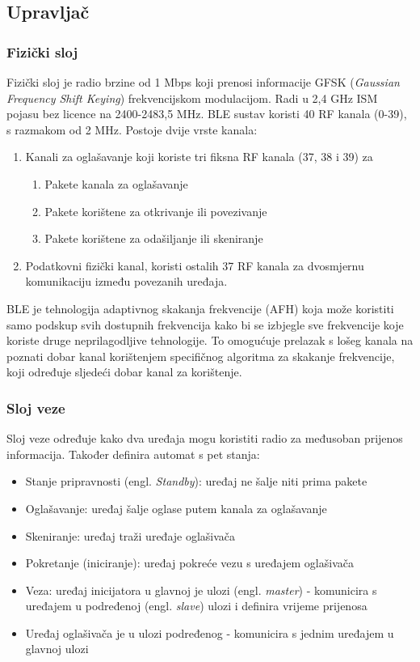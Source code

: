 \subsection{Upravljač}
\subsubsection{Fizički sloj}
Fizički sloj je radio brzine od 1 Mbps koji prenosi informacije GFSK (\textit{Gaussian Frequency Shift Keying}) frekvencijskom modulacijom. Radi u 2,4 GHz ISM pojasu bez licence na 2400-2483,5 MHz. 
BLE sustav koristi 40 RF kanala (0-39), s razmakom od 2 MHz. Postoje dvije vrste kanala:
\begin{enumerate}
	\item Kanali za oglašavanje koji koriste tri fiksna RF kanala (37, 38 i 39) za
	\begin{enumerate}
		\item Pakete kanala za oglašavanje
		\item Pakete korištene za otkrivanje ili povezivanje
		\item Pakete korištene za odašiljanje ili skeniranje
	\end{enumerate}
	\item Podatkovni fizički kanal, koristi ostalih 37 RF kanala za dvosmjernu komunikaciju između povezanih uređaja.
\end{enumerate}

BLE je tehnologija adaptivnog skakanja frekvencije (AFH) koja može koristiti samo podskup svih dostupnih frekvencija kako bi se izbjegle sve frekvencije koje koriste druge neprilagodljive tehnologije. To omogućuje prelazak s lošeg kanala na poznati dobar kanal korištenjem specifičnog algoritma za skakanje frekvencije, koji određuje sljedeći dobar kanal za korištenje.

\subsubsection{Sloj veze}
Sloj veze određuje kako dva uređaja mogu koristiti radio za međusoban prijenos informacija. Također definira automat s pet stanja:
\begin{itemize}
	\item Stanje pripravnosti (engl. \textit{Standby}): uređaj ne šalje niti prima pakete
	\item Oglašavanje: uređaj šalje oglase putem kanala za oglašavanje
	\item Skeniranje: uređaj traži uređaje oglašivača
	\item Pokretanje (iniciranje): uređaj pokreće vezu s uređajem oglašivača
	\item Veza: uređaj inicijatora u glavnoj je ulozi (engl. \textit{master}) - komunicira s uređajem u podređenoj (engl. \textit{slave}) ulozi i definira vrijeme prijenosa
	\item Uređaj oglašivača je u ulozi podređenog - komunicira s jednim uređajem u glavnoj ulozi 
\end{itemize}

